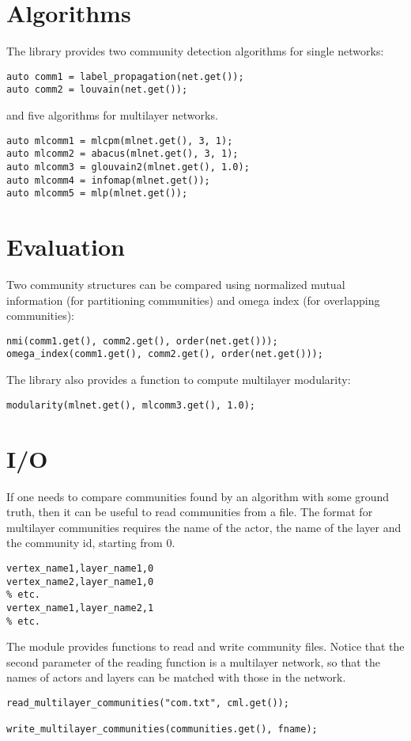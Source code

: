 \section{Algorithms}

The library provides two community detection algorithms for single networks:
\begin{lstlisting}[style=c++]
auto comm1 = label_propagation(net.get());
auto comm2 = louvain(net.get());
\end{lstlisting}
    
and five algorithms for multilayer networks.
\begin{lstlisting}[style=c++]
auto mlcomm1 = mlcpm(mlnet.get(), 3, 1);
auto mlcomm2 = abacus(mlnet.get(), 3, 1);
auto mlcomm3 = glouvain2(mlnet.get(), 1.0);
auto mlcomm4 = infomap(mlnet.get());
auto mlcomm5 = mlp(mlnet.get());
\end{lstlisting}
    
\section{Evaluation}

Two community structures can be compared using normalized mutual information (for partitioning communities) and omega index (for overlapping communities):
\begin{lstlisting}[style=c++]
nmi(comm1.get(), comm2.get(), order(net.get()));
omega_index(comm1.get(), comm2.get(), order(net.get()));
\end{lstlisting}

The library also provides a function to compute multilayer modularity:
\begin{lstlisting}[style=c++]
modularity(mlnet.get(), mlcomm3.get(), 1.0);
\end{lstlisting}

\section{I/O}

If one needs to compare communities found by an algorithm with some ground truth, then it can be useful to read communities from a file. The format for multilayer communities requires the name of the actor, the name of the layer and the community id, starting from 0.

\begin{lstlisting}[style=file]
vertex_name1,layer_name1,0
vertex_name2,layer_name1,0
% etc.
vertex_name1,layer_name2,1
% etc.
\end{lstlisting}

The  module provides functions to read and write community files. Notice that the second parameter of the reading function is a multilayer network, so that the names of actors and layers can be matched with those in the network.
\begin{lstlisting}[style=c++]
read_multilayer_communities("com.txt", cml.get());

write_multilayer_communities(communities.get(), fname);
\end{lstlisting}
